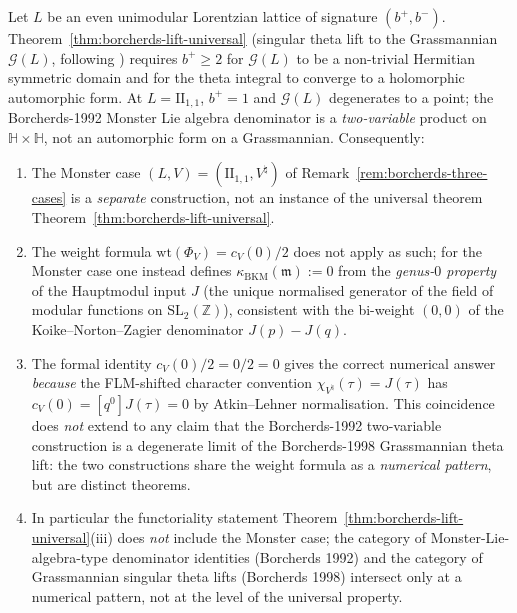 \begin{lemma}
\label{lem:monster-outside-grassmannian-lift}
Let $L$ be an even unimodular Lorentzian lattice of signature
$(b^+, b^-)$. Theorem~\ref{thm:borcherds-lift-universal} (singular
theta lift to the Grassmannian $\mathcal{G}(L)$, following
\cite[Thm.~13.3]{Borcherds1998}) requires $b^+ \ge 2$ for
$\mathcal{G}(L)$ to be a non-trivial Hermitian symmetric domain and
for the theta integral to converge to a holomorphic automorphic
form. At $L = \mathrm{II}_{1,1}$, $b^+ = 1$ and $\mathcal{G}(L)$
degenerates to a point; the Borcherds-1992 Monster Lie algebra
denominator \cite[Thm.~10.1]{Borcherds1992} is a
\emph{two-variable} product on $\mathbb{H} \times \mathbb{H}$, not
an automorphic form on a Grassmannian. Consequently:
\begin{enumerate}[label=\textup{(\roman*)}]
 \item The Monster case $(L, V) = (\mathrm{II}_{1,1}, V^\natural)$
 of Remark~\ref{rem:borcherds-three-cases} is a \emph{separate}
 construction, not an instance of the universal theorem
 Theorem~\ref{thm:borcherds-lift-universal}.
 \item The weight formula $\mathrm{wt}(\Phi_V) = c_V(0)/2$ does not
 apply as such; for the Monster case one instead defines
 $\kappa_{\mathrm{BKM}}(\mathfrak{m}) := 0$ from the
 \emph{genus-$0$ property} of the Hauptmodul input $J$ (the unique
 normalised generator of the field of modular functions on
 $\mathrm{SL}_2(\mathbb{Z})$), consistent with the bi-weight
 $(0, 0)$ of the Koike--Norton--Zagier denominator $J(p) - J(q)$.
 \item The formal identity $c_V(0)/2 = 0/2 = 0$ gives the correct
 numerical answer \emph{because} the FLM-shifted character
 convention $\chi_{V^\natural}(\tau) = J(\tau)$ has $c_V(0) =
 [q^0] J(\tau) = 0$ by Atkin--Lehner normalisation. This
 coincidence does \emph{not} extend to any claim that the
 Borcherds-1992 two-variable construction is a degenerate limit
 of the Borcherds-1998 Grassmannian theta lift: the two
 constructions share the weight formula as a \emph{numerical
 pattern}, but are distinct theorems.
 \item In particular the functoriality statement
 Theorem~\ref{thm:borcherds-lift-universal}(iii) does \emph{not}
 include the Monster case; the category of Monster-Lie-algebra-type
 denominator identities (Borcherds 1992) and the category of
 Grassmannian singular theta lifts (Borcherds 1998) intersect
 only at a numerical pattern, not at the level of the universal
 property.
\end{enumerate}
\end{lemma}

